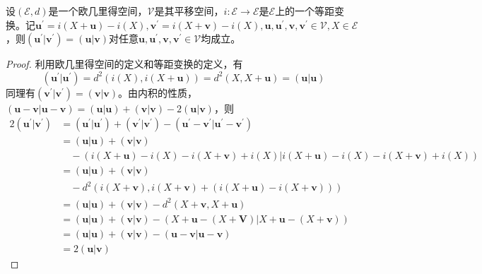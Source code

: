 \documentclass[main.tex]{subfiles}
\begin{document}
\begin{lemma}\label{thm:isom_l1}
设$\left(\mathcal{E},d\right)$是一个欧几里得空间，$\mathcal{V}$是其平移空间，$i:\mathcal{E}\rightarrow\mathcal{E}$是$\mathcal{E}$上的一个等距变换。记$\mathbf{u}^\prime=i\left(X+\mathbf{u}\right)-i\left(X\right),\mathbf{v}^\prime=i\left(X+\mathbf{v}\right)-i\left(X\right),\mathbf{u},\mathbf{u}^\prime,\mathbf{v},\mathbf{v}^\prime\in\mathcal{V},X\in\mathcal{E}$，则$\left(\mathbf{u}^\prime|\mathbf{v}^\prime\right)=\left(\mathbf{u}|\mathbf{v}\right)$对任意$\mathbf{u},\mathbf{u}^\prime,\mathbf{v},\mathbf{v}^\prime\in\mathcal{V}$均成立。
\end{lemma}
\begin{proof}
利用欧几里得空间的定义和等距变换的定义，有
\[
\left(\mathbf{u}^\prime|\mathbf{u}^\prime\right)=d^2\left(i\left(X\right),i\left(X+\mathbf{u}\right)\right)=d^2\left(X,X+\mathbf{u}\right)=\left(\mathbf{u}|\mathbf{u}\right)
\]
同理有$\left(\mathbf{v}^\prime|\mathbf{v}^\prime\right)=\left(\mathbf{v}|\mathbf{v}\right)$。由内积的性质，$\left(\mathbf{u}-\mathbf{v}|\mathbf{u}-\mathbf{v}\right)=\left(\mathbf{u}|\mathbf{u}\right)+\left(\mathbf{v}|\mathbf{v}\right)-2\left(\mathbf{u}|\mathbf{v}\right)$，则
\begin{align*}
    2\left(\mathbf{u}^\prime|\mathbf{v}^\prime\right)&=\left(\mathbf{u}^\prime|\mathbf{u}^\prime\right)+\left(\mathbf{v}^\prime|\mathbf{v}^\prime\right)-\left(\mathbf{u}^\prime-\mathbf{v}^\prime|\mathbf{u}^\prime-\mathbf{v}^\prime\right)\\
    &=\left(\mathbf{u}|\mathbf{u}\right)+\left(\mathbf{v}|\mathbf{v}\right)\\
    &\quad-\left(i\left(X+\mathbf{u}\right)-i\left(X\right)-i\left(X+\mathbf{v}\right)+i\left(X\right)|i\left(X+\mathbf{u}\right)-i\left(X\right)-i\left(X+\mathbf{v}\right)+i\left(X\right)\right)\\
    &=\left(\mathbf{u}|\mathbf{u}\right)+\left(\mathbf{v}|\mathbf{v}\right)\\
    &\quad-d^2\left(i\left(X+\mathbf{v}\right),i\left(X+\mathbf{v}\right)+\left(i\left(X+\mathbf{u}\right)-i\left(X+\mathbf{v}\right)\right)\right)\\
    &=\left(\mathbf{u}|\mathbf{u}\right)+\left(\mathbf{v}|\mathbf{v}\right)-d^2\left(X+\mathbf{v},X+\mathbf{u}\right)\\
    &=\left(\mathbf{u}|\mathbf{u}\right)+\left(\mathbf{v}|\mathbf{v}\right)-\left(X+\mathbf{u}-\left(X+\mathbf{V}\right)|X+\mathbf{u}-\left(X+\mathbf{v}\right)\right)\\
    &=\left(\mathbf{u}|\mathbf{u}\right)+\left(\mathbf{v}|\mathbf{v}\right)-\left(\mathbf{u}-\mathbf{v}|\mathbf{u}-\mathbf{v}\right)\\
    &=2\left(\mathbf{u}|\mathbf{v}\right)
\end{align*}
\end{proof}
\end{document}
